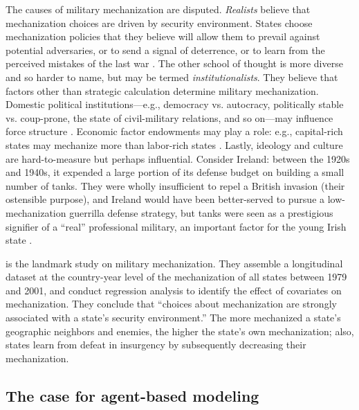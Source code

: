 \documentclass{article}
\begin{document}
The causes of military mechanization are disputed. \textit{Realists} believe 
that mechanization choices are driven by security environment. States
choose mechanization policies that they believe will allow them to prevail against potential adversaries, or to send a
signal of deterrence, or to learn from the perceived mistakes of the last war
\citep{mearsheimer1983conventional,huth1988extended,murray2011military}. The other school of thought is more
diverse and so harder to name, but may be termed 
\textit{institutionalists}. They believe that factors other than 
strategic calculation determine military mechanization. Domestic political
institutions---e.g., democracy vs. autocracy, politically stable vs.
coup-prone, the state of civil-military relations, and so on---may influence 
force structure \citep{reiter2002democracies,quinlivan1999coup,talmadge2015dictator,brooks2008shaping}. 
Economic factor
endowments may play a role: e.g., capital-rich states may mechanize more
than labor-rich states \citep{gartzke2001democracy}. Lastly,
ideology \citep{van1984cult} and culture \citep[e.g.][]{pollack2004arabs} are
hard-to-measure but perhaps influential. Consider Ireland: between the 1920s and
1940s, it expended a large portion of its defense budget on building
a small number of tanks. They were wholly insufficient to repel a British 
invasion (their ostensible purpose), and
Ireland would have been better-served to pursue a low-mechanization guerrilla
defense strategy, but tanks were seen as a prestigious signifier of a ``real''
professional military, an important factor for the young Irish state
\citep{farrell1998professionalization,farrell2001transnational}.

\citet{sechser2010army} is the landmark study on military mechanization. They
assemble a longitudinal dataset at the country-year level of the mechanization
of all states between 1979 and 2001, and conduct regression analysis to identify
the effect of covariates on mechanization. They conclude that ``choices about
mechanization are strongly associated with a state's security environment.''
The more mechanized a state's geographic neighbors and enemies, the higher the state's 
own mechanization; also, states
learn from defeat in insurgency by subsequently decreasing their mechanization.

\subsection{The case for agent-based modeling}
\end{document}
